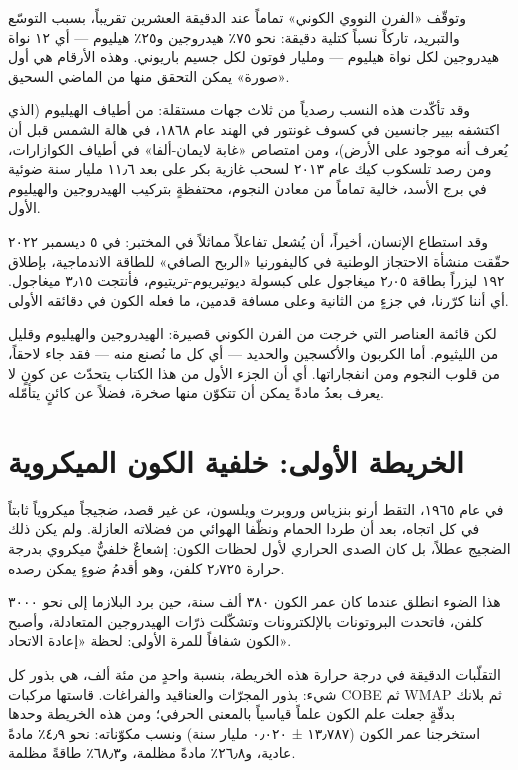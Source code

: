 \documentclass[12pt,a4paper,openany]{book}
\begin{document}
وتوقّف «الفرن النووي الكوني» تماماً عند الدقيقة العشرين تقريباً، بسبب التوسّع والتبريد، تاركاً نسباً كتلية دقيقة: نحو ٧٥٪ هيدروجين و٢٥٪ هيليوم — أي ١٢ نواة هيدروجين لكل نواة هيليوم — ومليار فوتون لكل جسيم باريوني. وهذه الأرقام هي أول «صورة» يمكن التحقق منها من الماضي السحيق.


وقد تأكّدت هذه النسب رصدياً من ثلاث جهات مستقلة: من أطياف الهيليوم (الذي اكتشفه بيير جانسين في كسوف غونتور في الهند عام ١٨٦٨، في هالة الشمس قبل أن يُعرف أنه موجود على الأرض)، ومن امتصاص «غابة لايمان-ألفا» في أطياف الكوازارات، ومن رصد تلسكوب كيك عام ٢٠١٣ لسحب غازية بكر على بعد ١١٫٦ مليار سنة ضوئية في برج الأسد، خالية تماماً من معادن النجوم، محتفظةٍ بتركيب الهيدروجين والهيليوم الأول.


وقد استطاع الإنسان، أخيراً، أن يُشعل تفاعلاً مماثلاً في المختبر: في ٥ ديسمبر ٢٠٢٢ حقّقت منشأة الاحتجاز الوطنية في كاليفورنيا «الربح الصافي» للطاقة الاندماجية، بإطلاق ١٩٢ ليزراً بطاقة ٢٫٠٥ ميغاجول على كبسولة ديوتيريوم-تريتيوم، فأنتجت ٣٫١٥ ميغاجول. أي أننا كرّرنا، في جزءٍ من الثانية وعلى مسافة قدمين، ما فعله الكون في دقائقه الأولى.


لكن قائمة العناصر التي خرجت من الفرن الكوني قصيرة: الهيدروجين والهيليوم وقليل من الليثيوم. أما الكربون والأكسجين والحديد — أي كل ما نُصنع منه — فقد جاء لاحقاً، من قلوب النجوم ومن انفجاراتها. أي أن الجزء الأول من هذا الكتاب يتحدّث عن كونٍ لا يعرف بعدُ مادةً يمكن أن تتكوّن منها صخرة، فضلاً عن كائنٍ يتأمّله.


\chapter*{الخريطة الأولى: خلفية الكون الميكروية}




في عام ١٩٦٥، التقط أرنو بنزياس وروبرت ويلسون، عن غير قصد، ضجيجاً ميكروياً ثابتاً في كل اتجاه، بعد أن طردا الحمام ونظّفا الهوائي من فضلاته العازلة. ولم يكن ذلك الضجيج عطلاً، بل كان الصدى الحراري لأول لحظات الكون: إشعاعٌ خلفيٌّ ميكروي بدرجة حرارة ٢٫٧٢٥ كلفن، وهو أقدمُ ضوءٍ يمكن رصده.


هذا الضوء انطلق عندما كان عمر الكون ٣٨٠ ألف سنة، حين برد البلازما إلى نحو ٣٠٠٠ كلفن، فاتحدت البروتونات بالإلكترونات وتشكّلت ذرّات الهيدروجين المتعادلة، وأصبح الكون شفافاً للمرة الأولى: لحظة «إعادة الاتحاد».


التقلّبات الدقيقة في درجة حرارة هذه الخريطة، بنسبة واحدٍ من مئة ألف، هي بذور كل شيء: بذور المجرّات والعناقيد والفراغات. قاستها مركبات COBE ثم WMAP ثم بلانك بدقّةٍ جعلت علم الكون علماً قياسياً بالمعنى الحرفي؛ ومن هذه الخريطة وحدها استخرجنا عمر الكون (١٣٫٧٨٧ ± ٠٫٠٢٠ مليار سنة) ونسب مكوّناته: نحو ٤٫٩٪ مادةً عادية، و٢٦٫٨٪ مادةً مظلمة، و٦٨٫٣٪ طاقةً مظلمة.
\end{document}

